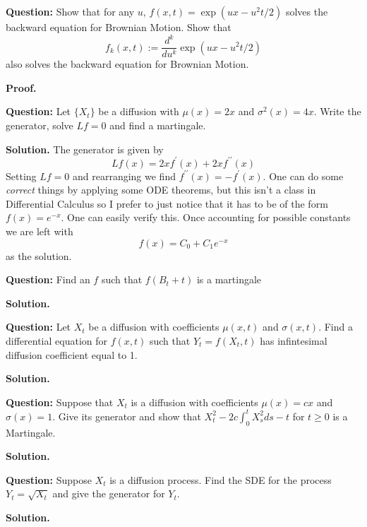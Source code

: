 \documentclass{article}
\begin{document}
\begin{tcolorbox}[colframe=black,colback=gray!5,boxrule=0.5pt]
\textbf{Question:} Show that for any $u$, $f(x,t) = \exp(ux-u^2t/2)$ solves the backward equation for Brownian Motion. Show that 
$$f_k(x,t) := \frac{d^k}{du^k}\exp(ux-u^2t/2)$$
also solves the backward equation for Brownian Motion.
\end{tcolorbox}
\textbf{Proof.}

\begin{tcolorbox}[colframe=black,colback=gray!5,boxrule=0.5pt]
\textbf{Question:} Let $\{X_t\}$ be a diffusion with $\mu(x) = 2x$ and $\sigma^2(x) = 4x$. Write the generator, solve $Lf=0$ and find a martingale.  
\end{tcolorbox}
\textbf{Solution.} The generator is given by
$$Lf(x) = 2x f^\prime(x) + 2xf^{\prime\prime}(x)$$
Setting $Lf=0$ and rearranging we find $f^{\prime \prime}(x) = -f^\prime(x)$. One can do some \textit{correct} things by applying some ODE theorems, but this isn't a class in Differential Calculus so I prefer to just notice that it has to be of the form $f(x) = e^{-x}$. One can easily verify this. Once accounting for possible constants we are left with 
$$f(x) = C_0 + C_1e^{-x}$$
as the solution. 


\begin{tcolorbox}[colframe=black,colback=gray!5,boxrule=0.5pt]
\textbf{Question:} Find an $f$ such that $f(B_t + t)$ is a martingale
\end{tcolorbox}
\textbf{Solution.}

\begin{tcolorbox}[colframe=black,colback=gray!5,boxrule=0.5pt]
\textbf{Question:} Let $X_t$ be a diffusion with coefficients $\mu(x,t)$ and $\sigma(x,t)$. Find a differential equation for $f(x,t)$ such that $Y_t = f(X_t,t)$ has infintesimal diffusion coefficient equal to 1. 
\end{tcolorbox}
\textbf{Solution.}

\begin{tcolorbox}[colframe=black,colback=gray!5,boxrule=0.5pt]
\textbf{Question:} Suppose that $X_t$ is a diffusion with coefficients $\mu(x) = cx$ and $\sigma(x)=1$. Give its generator and show that $X_t^2-2c\int_0^tX_s^2ds-t$ for $t\geq0$ is a Martingale.
\end{tcolorbox}
\textbf{Solution.}

\begin{tcolorbox}[colframe=black,colback=gray!5,boxrule=0.5pt]
\textbf{Question:} Suppose $X_t$ is a diffusion process. Find the SDE for the process $Y_t = \sqrt{X_t}$ and give the generator for $Y_t$.
\end{tcolorbox}
\textbf{Solution.}
\end{document}
